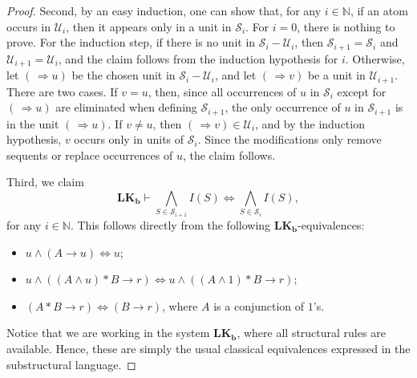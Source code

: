 \documentclass[10pt,a4paper]{amsart}
\newcommand{\LKb}{\mathbf{LK_b}}
\begin{document}
\begin{proof}
Second, by an easy induction, one can show that, for any $i\in\mathbb{N}$, if an atom occurs in $\mathcal{U}_i$, then it appears only in a unit in $\mathcal{S}_i$. For $i=0$, there is nothing to prove. For the induction step, if there is no unit in $\mathcal{S}_i-\mathcal{U}_i$, then $\mathcal{S}_{i+1}=\mathcal{S}_i$ and $\mathcal{U}_{i+1}=\mathcal{U}_i$, and the claim follows from the induction hypothesis for $i$. Otherwise, let $(\,\Rightarrow u)$ be the chosen unit in $\mathcal{S}_i-\mathcal{U}_i$, and let $(\,\Rightarrow v)$ be a unit in $\mathcal{U}_{i+1}$. There are two cases. If $v=u$, then, since all occurrences of $u$ in $\mathcal{S}_i$ except for $(\,\Rightarrow u)$ are eliminated when defining $\mathcal{S}_{i+1}$, the only occurrence of $u$ in $\mathcal{S}_{i+1}$ is in the unit $(\,\Rightarrow u)$. If $v\neq u$, then $(\,\Rightarrow v)\in\mathcal{U}_i$, and by the induction hypothesis, $v$ occurs only in units of $\mathcal{S}_i$. Since the modifications only remove sequents or replace occurrences of $u$, the claim follows.

Third, we claim 
\[
\LKb \vdash
\bigwedge_{S\in\mathcal{S}_{i+1}} I(S)
\Leftrightarrow
\bigwedge_{S\in\mathcal{S}_{i}} I(S),
\]
for any $i\in\mathbb{N}$. This follows directly from the following
$\LKb$-equivalences:
\begin{itemize}
    \item
    $u\wedge(A\to u)\Leftrightarrow u$;
    
    \item
    $u\wedge((A\wedge u)*B\to r)
    \Leftrightarrow
    u\wedge((A\wedge 1)*B\to r)$;
    
    \item
    $(A*B\to r)\Leftrightarrow(B\to r)$,
    where $A$ is a conjunction of $1$'s.
\end{itemize}
Notice that we are working in the system $\LKb$, where all structural rules
are available. Hence, these are simply the usual classical equivalences
expressed in the substructural language.


\end{proof}
\end{document}
